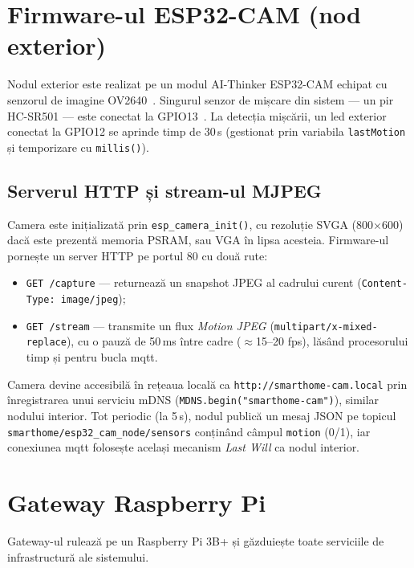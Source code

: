 \section{Firmware-ul ESP32-CAM (nod exterior)}
\label{sec:firmware-cam}

Nodul exterior este realizat pe un modul AI-Thinker ESP32-CAM echipat cu
senzorul de imagine OV2640~\cite{espressif2023esp32cam}.
Singurul senzor de mișcare din sistem — un \gls{pir} HC-SR501 — este
conectat la GPIO13~\cite{pir2019hcsr501}.
La detecția mișcării, un \gls{led} exterior conectat la GPIO12 se aprinde
timp de 30\,s (gestionat prin variabila \texttt{lastMotion} și temporizare
cu \texttt{millis()}).

\subsection{Serverul HTTP și stream-ul MJPEG}
\label{sec:mjpeg}

Camera este inițializată prin \texttt{esp\_camera\_init()}, cu rezoluție
SVGA (800$\times$600) dacă este prezentă memoria PSRAM, sau VGA în lipsa
acesteia.
Firmware-ul pornește un server HTTP pe portul 80 cu două rute:
\begin{itemize}
  \item \texttt{GET /capture} — returnează un snapshot JPEG al cadrului
        curent (\texttt{Content-Type: image/jpeg});
  \item \texttt{GET /stream} — transmite un flux \emph{Motion JPEG}
        (\texttt{multipart/x-mixed-replace}), cu o pauză de 50\,ms între
        cadre ($\approx$15–20 fps), lăsând procesorului timp și pentru
        bucla \gls{mqtt}.
\end{itemize}

Camera devine accesibilă în rețeaua locală ca
\texttt{http://smarthome-cam.local} prin înregistrarea unui serviciu mDNS
(\texttt{MDNS.begin("smarthome-cam")}), similar nodului interior.
Tot periodic (la 5\,s), nodul publică un mesaj JSON pe topicul
\texttt{smarthome/esp32\_cam\_node/sensors} conținând câmpul \texttt{motion}
(0/1), iar conexiunea \gls{mqtt} folosește același mecanism
\emph{Last Will} ca nodul interior.

\section{Gateway Raspberry Pi}
\label{sec:gateway}

Gateway-ul rulează pe un Raspberry Pi 3B+ și găzduiește toate serviciile
de infrastructură ale sistemului.

